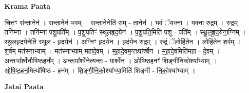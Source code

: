 \documentclass[17pt]{extarticle}
\begin{document}
\textbf{Krama Paata} \newline

चि॒त्तꣳ स॑न्ता॒नेन॑ । स॒न्ता॒नेन॑ भ॒वम् । स॒न्ता॒नेनेति॑ सम् - ता॒नेन॑ । भ॒वं ॅय॒क्ना । य॒क्ना रु॒द्रम् । रु॒द्रम् तनि॑म्ना । तनि॑म्ना पशु॒पति᳚म् । प॒शु॒पतिꣳ॑ स्थूलहृद॒येन॑ । प॒शु॒पति॒मिति॑ पशु - पति᳚म् । स्थू॒ल॒हृ॒द॒येना॒ग्निम् । स्थू॒ल॒हृ॒द॒येनेति॑ स्थूल - हृ॒द॒येन॑ । अ॒ग्निꣳ हृद॑येन । हृद॑येन रु॒द्रम् । रु॒द्रं ॅलोहि॑तेन । लोहि॑तेन श॒र्वम् । श॒र्वम् मत॑स्नाभ्याम् । मत॑स्नाभ्याम् महादे॒वम् । म॒हा॒दे॒वम॒न्तःपा᳚र्श्वेन । म॒हा॒दे॒वमिति॑महा - दे॒वम् । अ॒न्तःपा᳚र्श्वेनौषिष्ठ॒हन᳚म् । अ॒न्तःपा᳚र्श्वे॒नेत्य॒न्तः - पा॒र्श्वे॒न॒ । ओ॒षि॒ष्ठ॒हनꣳ॑ शिङ्गीनिको॒श्या᳚भ्याम् । ओ॒षि॒ष्ठ॒हन॒मित्यो॑षिष्ठ - हन᳚म् । शि॒ङ्गी॒नि॒को॒श्या᳚भ्या॒मिति॑ शिङ्गी - नि॒को॒श्या᳚भ्याम् । \newline

\textbf{Jatai Paata} \newline
\end{document}
